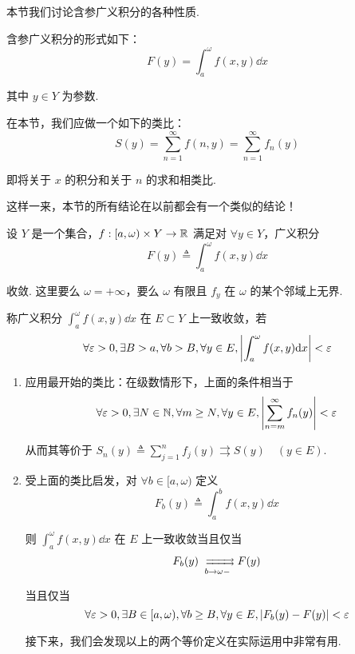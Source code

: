 本节我们讨论含参广义积分的各种性质.

含参广义积分的形式如下：
$$
F(y)=\int_a^\omega f(x,y)\dd x
$$

其中 $y\in Y$ 为参数.

在本节，我们应做一个如下的类比：
$$
S(y)=\sum_{n=1}^\infty f(n,y)=\sum_{n=1}^\infty f_n(y)
$$

即将关于 $x$ 的积分和关于 $n$ 的求和相类比.

这样一来，本节的所有结论在以前都会有一个类似的结论！



设 $Y$ 是一个集合，$f:[a,\omega)\times Y\to\mathbb{R}$ 满足对 $\forall y\in Y$，广义积分
$$
F(y)\triangleq\int_a^\omega f(x,y)\dd x
$$

收敛. 这里要么 $\omega=+\infty$，要么 $\omega$ 有限且 $f_y$ 在 $\omega$ 的某个邻域上无界.

\begin{definition}
    称广义积分 $\displaystyle\int_a^\omega f(x,y)\dd x$ 在 $E\subset Y$ 上一致收敛，若
$$
\forall\varepsilon>0,\exists B>a,\forall b>B,\forall y\in E,\left\lvert{\int_a^\omega f(x,y)\mathrm{d}x}\right\rvert<\varepsilon
$$
\end{definition}

\begin{hint}
    \begin{enumerate}
        \item 应用最开始的类比：在级数情形下，上面的条件相当于
$$
\forall\varepsilon>0,\exists N\in\mathbb{N},\forall m\ge N,\forall y\in E,\left\lvert{\sum_{n=m}^\infty f_n(y)}\right\rvert<\varepsilon
$$

        从而其等价于 $S_n(y)\triangleq\displaystyle\sum_{j=1}^nf_j(y)\rightrightarrows S(y)\quad(y\in E)$.

        \item 受上面的类比启发，对 $\forall b\in[a,\omega)$ 定义
$$
F_b(y)\triangleq\int_a^bf(x,y)\dd x
$$

        则 $\displaystyle\int_a^\omega f(x,y)\dd x$ 在 $E$ 上一致收敛当且仅当
$$
F_b(y)\xrightrightarrows[b\to\omega-]{}F(y)
$$

        当且仅当
$$
\forall\varepsilon>0,\exists B\in[a,\omega),\forall b\ge B,\forall y\in E,\left\lvert{F_b(y)-F(y)}\right\rvert<\varepsilon
$$

        接下来，我们会发现以上的两个等价定义在实际运用中非常有用.
    \end{enumerate}
\end{hint}

